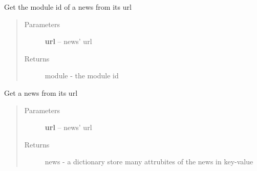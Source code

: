 \documentclass[letterpaper,10pt,english]{sphinxmanual}
\begin{document}

\begin{fulllineitems}
\label{sysunews:sysunews.api.get_module}
Get the module id of a news from its url
\begin{quote}\begin{description}
\item[{Parameters}] \leavevmode
\textbf{url} -- news' url

\item[{Returns}] \leavevmode
module - the module id

\end{description}\end{quote}

\end{fulllineitems}


\begin{fulllineitems}
\label{sysunews:sysunews.api.get_news}
Get a news from its url
\begin{quote}\begin{description}
\item[{Parameters}] \leavevmode
\textbf{url} -- news' url

\item[{Returns}] \leavevmode
news - a dictionary store many attrubites of the news in key-value

\end{description}\end{quote}

\end{fulllineitems}

\end{document}

